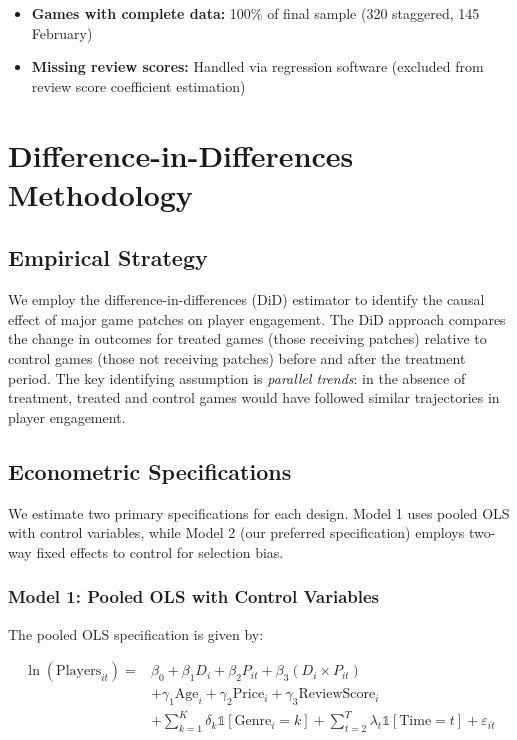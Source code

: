 \documentclass[12pt,a4paper]{article}
\begin{document}
\begin{itemize}
    \item \textbf{Games with complete data:} 100\% of final sample (320 staggered, 145 February)
    \item \textbf{Missing review scores:} Handled via regression software (excluded from review score coefficient estimation)
\end{itemize}

\section{Difference-in-Differences Methodology}

\subsection{Empirical Strategy}

We employ the difference-in-differences (DiD) estimator to identify the causal effect of major game patches on player engagement. The DiD approach compares the change in outcomes for treated games (those receiving patches) relative to control games (those not receiving patches) before and after the treatment period. The key identifying assumption is \textit{parallel trends}: in the absence of treatment, treated and control games would have followed similar trajectories in player engagement.

\subsection{Econometric Specifications}

We estimate two primary specifications for each design. Model 1 uses pooled OLS with control variables, while Model 2 (our preferred specification) employs two-way fixed effects to control for selection bias.

\subsubsection{Model 1: Pooled OLS with Control Variables}

The pooled OLS specification is given by:

\begin{equation}
\begin{split}
\ln(\text{Players}_{it}) = & \beta_0 + \beta_1 D_i + \beta_2 P_{it} + \beta_3 (D_i \times P_{it}) \\
& + \gamma_1 \text{Age}_i + \gamma_2 \text{Price}_i + \gamma_3 \text{ReviewScore}_i \\
& + \sum_{k=1}^{K} \delta_k \mathbb{1}[\text{Genre}_i = k] + \sum_{t=2}^{T} \lambda_t \mathbb{1}[\text{Time} = t] + \varepsilon_{it}
\end{split}
\end{equation}
\end{document}
